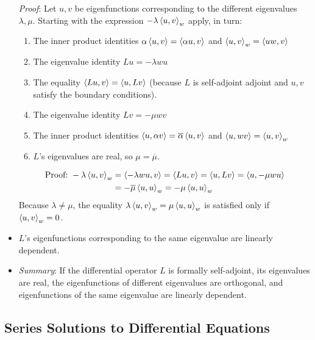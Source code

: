 \documentclass[11pt, a4paper]{article}
\begin{document}
\begin{itemize}
	\textit{Proof}: Let $ u, v $ be eigenfunctions corresponding to the different eigenvalues $ \lambda, \mu $. Starting with the expression $ -\lambda  \expval{u, v}_{w} $ apply, in turn:
		\begin{enumerate}
			\item  The inner product identities $ \alpha \expval{u, v} = \expval{\alpha u, v} $ and $ \expval{u, v}_{w} = \expval{uw, v} $
			\item The eigenvalue identity $ Lu = -\lambda w u $
			\item The equality $ \expval{Lu, v} = \expval{u, Lv} $ (because $ L $ is self-adjoint adjoint and  $ u, v $ satisfy the boundary conditions).
			\item The eigenvalue identity $ Lv = -\mu w v $
			\item The inner product identities $ \expval{ u,\alpha v} =  \overline{\alpha} \expval{u, v} $ and $ \expval{u, wv} = \expval{u, v}_{w} $
			\item $ L $'s eigenvalues are real, so $ \mu = \overline{\mu} $.
		\end{enumerate}
		\vspace{-4mm}
		\begin{align*}
 			\text{Proof:} \ -\lambda  \expval{u, v}_{w} &=  \expval{- \lambda w u, v} = \expval{L u, v} = \expval{u, Lv} = \expval{u, -\mu w u}\\
 			& = -\overline{\mu}\expval{u,  u}_{w} = -\mu \expval{u,  u}_{w}
		\end{align*}
		Because $ \lambda \neq \mu $, the equality $ \lambda  \expval{u, v}_{w} = \mu \expval{u,  u}_{w} $ is satisfied only if $ \expval{u, v}_{w} = 0 $.
		
		\item $ L $'s eigenfunctions corresponding to the same eigenvalue are linearly dependent.
	
	\item \textit{Summary}: If the differential operator $ L $ is formally self-adjoint, its eigenvalues are real, the eigenfunctions of different eigenvalues are orthogonal, and eigenfunctions of the same eigenvalue are linearly dependent.
\end{itemize}


\subsection{Series Solutions to Differential Equations}
\end{document}

